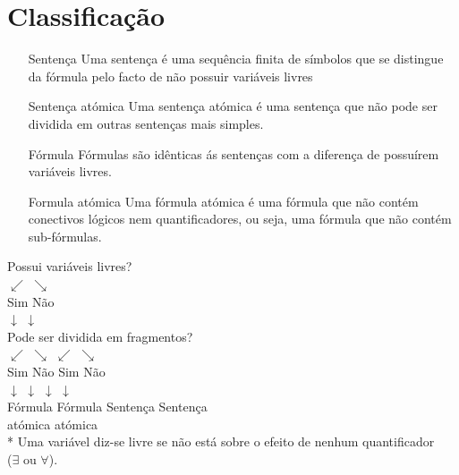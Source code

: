 \documentclass[10pt,a4paper]{report}
\begin{document}
\chapter{Classificação}
\begin{itemize}
\item[Sentença] Uma sentença é uma sequência finita de símbolos que se distingue da fórmula pelo facto de não possuir variáveis livres
\item[Sentença atómica] Uma sentença atómica é uma sentença que não pode ser dividida em outras sentenças mais simples.
\item[Fórmula] Fórmulas são idênticas ás sentenças com a diferença de possuírem variáveis livres.
\item[Formula atómica]Uma fórmula atómica é uma fórmula que não contém conectivos lógicos nem quantificadores, ou seja, uma fórmula que não contém sub-fórmulas.
\end{itemize}
\vspace{1.5cm}
\begin{center}
Possui variáveis livres?\\
$\swarrow$ \hspace{3cm} $\searrow$\\
Sim \hspace{3.3cm} Não\\
$\downarrow$ \hspace{3.7cm} $\downarrow$\\
Pode ser dividida em fragmentos?\\
$\swarrow$ \hspace{1cm} $\searrow$ \hspace{2.5cm} $\swarrow$ \hspace{1cm} $\searrow$\\
Sim \hspace{1cm} Não \hspace{2cm} Sim \hspace{1cm} Não \\
$\downarrow$ \hspace{1.5cm} $\downarrow$ \hspace{2.5cm} $\downarrow$ \hspace{1.5cm} $\downarrow$\\
Fórmula \hspace{0.5cm} Fórmula \hspace{1.3cm} Sentença \hspace{0.3cm} Sentença\\
\hspace{1.9cm} atómica \hspace{3.3cm} atómica\\
\vspace{1.5cm}
* Uma variável diz-se livre se não está sobre o efeito de nenhum quantificador\\ ($\exists$ ou $\forall$).
\end{center}
\end{document}
